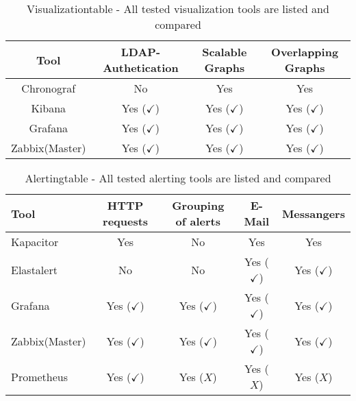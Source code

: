 \begin{table} 
\centering

\begin{tabular}{cccc}
	\hline
Tool & LDAP-Authetication         & Scalable Graphs             & Overlapping Graphs          \\
\hline
Chronograf & No & Yes & Yes \\
Kibana & Yes ($ \checkmark $) & Yes ($ \checkmark $) & Yes ($ \checkmark $)\\
Grafana & Yes ($ \checkmark $) & Yes ($ \checkmark $) & Yes ($ \checkmark $)\\
Zabbix(Master) & Yes ($ \checkmark $) & Yes ($ \checkmark $)  & Yes  ($ \checkmark $)\\
\hline
\end{tabular}
\caption{Visualizationtable - All tested visualization tools are listed and compared}
\label{tab:Visualization}
\end{table}

\begin{table}
	\centering
	
	\begin{tabular}{lcccc}
		\hline
Tool & HTTP requests & Grouping of alerts & E-Mail & Messangers \\
\hline
Kapacitor & Yes  & No & Yes & Yes \\
Elastalert & No & No & Yes ($ \checkmark $) & Yes ($ \checkmark $) \\
Grafana & Yes ($ \checkmark $) & Yes ($ \checkmark $) & Yes ($ \checkmark $) & Yes ($ \checkmark $) \\
Zabbix(Master) & Yes ($ \checkmark $) & Yes ($ \checkmark $) & Yes ($ \checkmark $) & Yes ($ \checkmark $) \\
Prometheus & Yes ($ \checkmark $) & Yes ($ X $) & Yes ($ X $) & Yes ($ X $)\\
		\hline
	\end{tabular}
	\caption{Alertingtable - All tested alerting tools are listed and compared}
	\label{tab:Alerting}
\end{table}


